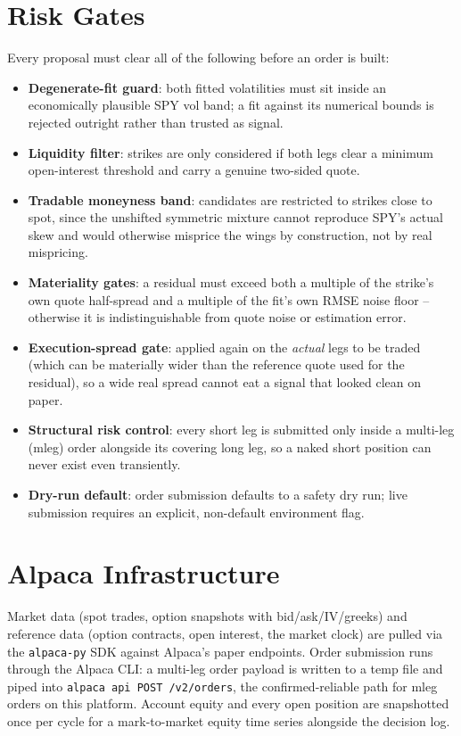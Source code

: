 \documentclass[10pt]{article}
\begin{document}
\section*{Risk Gates}
Every proposal must clear all of the following before an order is built:
\begin{itemize}
  \item \textbf{Degenerate-fit guard}: both fitted volatilities must sit inside an
    economically plausible SPY vol band; a fit against its numerical bounds is
    rejected outright rather than trusted as signal.
  \item \textbf{Liquidity filter}: strikes are only considered if both legs clear a
    minimum open-interest threshold and carry a genuine two-sided quote.
  \item \textbf{Tradable moneyness band}: candidates are restricted to strikes close
    to spot, since the unshifted symmetric mixture cannot reproduce SPY's actual
    skew and would otherwise misprice the wings by construction, not by real
    mispricing.
  \item \textbf{Materiality gates}: a residual must exceed both a multiple of the
    strike's own quote half-spread and a multiple of the fit's own RMSE noise
    floor -- otherwise it is indistinguishable from quote noise or estimation
    error.
  \item \textbf{Execution-spread gate}: applied again on the \emph{actual} legs to
    be traded (which can be materially wider than the reference quote used for the
    residual), so a wide real spread cannot eat a signal that looked clean on
    paper.
  \item \textbf{Structural risk control}: every short leg is submitted only inside
    a multi-leg (mleg) order alongside its covering long leg, so a naked short
    position can never exist even transiently.
  \item \textbf{Dry-run default}: order submission defaults to a safety dry run;
    live submission requires an explicit, non-default environment flag.
\end{itemize}

\section*{Alpaca Infrastructure}
Market data (spot trades, option snapshots with bid/ask/IV/greeks) and reference
data (option contracts, open interest, the market clock) are pulled via the
\texttt{alpaca-py} SDK against Alpaca's paper endpoints. Order submission runs
through the Alpaca CLI: a multi-leg order payload is written to a temp file and
piped into \texttt{alpaca api POST /v2/orders}, the confirmed-reliable path for
mleg orders on this platform. Account equity and every open position are
snapshotted once per cycle for a mark-to-market equity time series alongside the
decision log.
\end{document}
